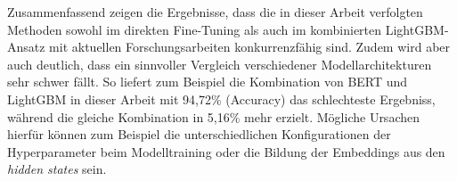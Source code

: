 Zusammenfassend zeigen die Ergebnisse, dass die in dieser Arbeit verfolgten Methoden sowohl im direkten Fine-Tuning als auch im kombinierten
LightGBM-Ansatz mit aktuellen Forschungsarbeiten konkurrenzfähig sind.
Zudem wird aber auch deutlich, dass ein sinnvoller Vergleich verschiedener Modellarchitekturen sehr schwer fällt.
So liefert zum Beispiel die Kombination von BERT und LightGBM in dieser Arbeit mit 94,72\% (Accuracy) das schlechteste Ergebniss, während die gleiche Kombination
in \cite{Essa:2023aa} 5,16\% mehr erzielt.
Mögliche Ursachen hierfür können zum Beispiel die unterschiedlichen Konfigurationen der Hyperparameter beim Modelltraining oder die Bildung der Embeddings aus den
\textit{hidden states} sein. 